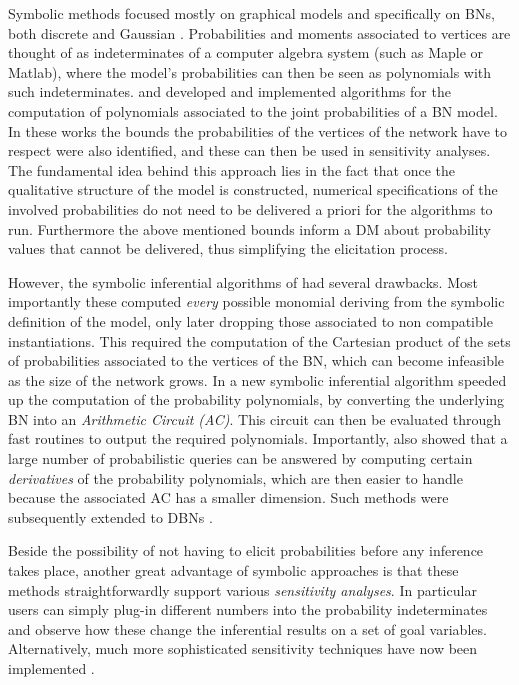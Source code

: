 Symbolic methods focused mostly on graphical models and specifically on BNs, both discrete \citep{Castillo1995,Castillo1997a} and Gaussian \citep{Castillo1997}. Probabilities and moments associated to vertices are thought of as indeterminates of a computer algebra system (such as Maple or Matlab), where the model's probabilities can then be seen as polynomials with such indeterminates.  \citet{Castillo1996a} and \citet{Castillo2003} developed and implemented algorithms for the computation of polynomials associated to the joint probabilities of a BN model. In these works the bounds the probabilities of the vertices of the network have to respect were also identified, and these can then be used in sensitivity analyses. The fundamental idea behind this approach lies in the fact that once the qualitative structure of the model is constructed, numerical specifications of the involved probabilities do not need to be delivered a priori for the algorithms to run. Furthermore the above mentioned bounds inform a DM about probability values that cannot be delivered, thus simplifying the elicitation process. 

However, the symbolic inferential algorithms of \citet{Castillo1997b} had several drawbacks. Most importantly these computed \textit{every} possible monomial deriving from the symbolic definition of the model, only later dropping those associated to non compatible instantiations. This required the computation of the Cartesian product  of the sets of probabilities associated to the vertices of the BN, which can become infeasible as the size of the network grows. In \citet{Darwiche2003} a new symbolic inferential algorithm speeded up the computation of the probability polynomials, by converting the underlying BN into an \textit{Arithmetic Circuit (AC)}. This circuit can then be evaluated through fast routines to output the required polynomials. Importantly, \citet{Darwiche2003} also showed that a large number of probabilistic queries can be answered by computing certain \textit{derivatives} of the probability polynomials, which are then easier to handle because the associated AC has a smaller dimension. Such methods were subsequently extended to DBNs \citep{Brandherm2004}.

Beside the possibility of not having to elicit probabilities before any inference takes place, another great advantage of symbolic approaches is that these methods straightforwardly support various \textit{sensitivity analyses}. In particular users can simply plug-in different numbers into the probability indeterminates and observe how these change the inferential results on a set of goal variables. Alternatively, much more sophisticated sensitivity techniques have now been implemented \citep{Chan2001,Chan2004}. 

